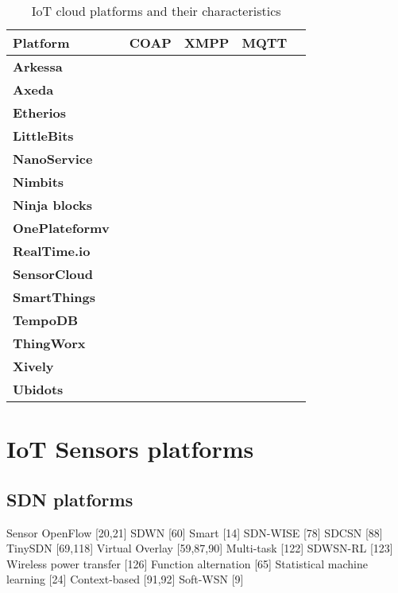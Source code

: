 \begin{table}[h!]
\scriptsize
	\begin{tabulary}{\textwidth}{L|C|C|C|C}
	\bf{Platform}      & \ \bf{COAP} & \bf{XMPP} & \bf{MQTT}\\\hline
	\bf{Arkessa}       &             &           & \ok      \\\hline
	\bf{Axeda}         &             &           &          \\\hline
	\bf{Etherios}      &             &           &          \\\hline
	\bf{LittleBits}    &             &           &          \\\hline
	\bf{NanoService}   & \ok         &           &          \\\hline
	\bf{Nimbits}       &             & \ok       &          \\\hline
	\bf{Ninja blocks}  &             &           &          \\\hline
	\bf{OnePlateformv} & \ok         & \ok       &          \\\hline
	\bf{RealTime.io}   &             &           &          \\\hline
	\bf{SensorCloud}   &             &           &          \\\hline
	\bf{SmartThings}   &             &           &          \\\hline
	\bf{TempoDB}       &             &           &          \\\hline
	\bf{ThingWorx}     &             &           & \ok      \\\hline
	\bf{Xively}        &             &           & \ok      \\\hline
	\bf{Ubidots}       &             &           & \ok      \\\hline
	\end{tabulary}
	\caption{\label{tab:IoTPlatforms} IoT cloud platforms and their characteristics}
\end{table}



\section{IoT Sensors platforms}

\subsection{SDN platforms}

Sensor OpenFlow [20,21]
SDWN [60]
Smart [14]
SDN-WISE [78]
SDCSN [88]
TinySDN [69,118]
Virtual Overlay [59,87,90]
Multi-task [122]
SDWSN-RL [123]
Wireless power transfer [126]
Function alternation [65]
Statistical machine learning [24]
Context-based [91,92]
Soft-WSN [9]

